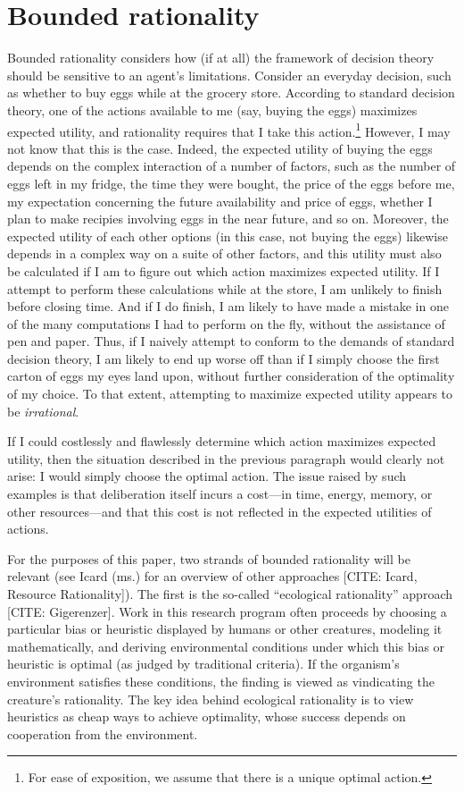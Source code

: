 \section{Bounded rationality}

Bounded rationality considers how (if at all) the framework of decision theory should be sensitive to an agent's limitations.
Consider an everyday decision, such as whether to buy eggs while at the grocery store.
According to standard decision theory, one of the actions available to me (say, buying the eggs) maximizes expected utility, and rationality requires that I take this action.\footnote{For ease of exposition, we assume that there is a unique optimal action.}
However, I may not know that this is the case.
Indeed, the expected utility of buying the eggs depends on the complex interaction of a number of factors, such as the number of eggs left in my fridge, the time they were bought, the price of the eggs before me, my expectation concerning the future availability and price of eggs, whether I plan to make recipies involving eggs in the near future, and so on.
Moreover, the expected utility of each other options (in this case, not buying the eggs) likewise depends in a complex way on a suite of other factors, and this utility must also be calculated if I am to figure out which action maximizes expected utility.
If I attempt to perform these calculations while at the store, I am unlikely to finish before closing time.
And if I do finish, I am likely to have made a mistake in one of the many computations I had to perform on the fly, without the assistance of pen and paper.
Thus, if I naively attempt to conform to the demands of standard decision theory, I am likely to end up worse off than if I simply choose the first carton of eggs my eyes land upon, without further consideration of the optimality of my choice.
To that extent, attempting to maximize expected utility appears to be \emph{irrational}.

If I could costlessly and flawlessly determine which action maximizes expected utility, then the situation described in the previous paragraph would clearly not arise: I would simply choose the optimal action.
The issue raised by such examples is that deliberation itself incurs a cost---in time, energy, memory, or other resources---and that this cost is not reflected in the expected utilities of actions.

For the purposes of this paper, two strands of bounded rationality will be relevant (see Icard (ms.) for an overview of other approaches [CITE: Icard, Resource Rationality]).
The first is the so-called ``ecological rationality'' approach [CITE: Gigerenzer].
Work in this research program often proceeds by choosing a particular bias or heuristic displayed by humans or other creatures, modeling it mathematically, and deriving environmental conditions under which this bias or heuristic is optimal (as judged by traditional criteria).
If the organism's environment satisfies these conditions, the finding is viewed as vindicating the creature's rationality.
The key idea behind ecological rationality is to view heuristics as cheap ways to achieve optimality, whose success depends on cooperation from the environment.

